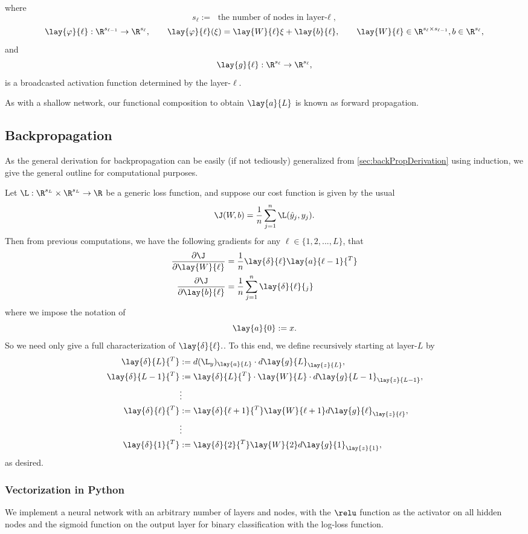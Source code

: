 where
$$s_\ell :=\text{ the number of nodes in layer-$\ell$},$$
$$\lay{\varphi}{\ell}:\R^{s_{\ell-1}}\to\R^{s_\ell},\qquad \lay{\varphi}{\ell}(\xi)=\lay{W}{\ell}\xi+\lay{b}{\ell},\qquad \lay{W}{\ell}\in\R^{s_\ell\times s_{\ell-1}},b\in\R^{s_\ell},$$
and
$$\lay{g}{\ell}:\R^{s_\ell}\to\R^{s_\ell},$$
is a broadcasted activation function determined by the layer-$\ell$.

As with a shallow network, our functional composition to obtain $\lay{a}{L}$ is known as forward propagation.

\subsection{Backpropagation}
As the general derivation for backpropagation can be easily (if not tediously) generalized from \cref{sec:backPropDerivation} using induction, we give the general outline for computational purposes.

Let $\L:\R^{s_L}\times\R^{s_L}\to\R$ be a generic loss function, and suppose our cost function is given by the usual
$$\J(W,b)=\frac{1}{n}\sum_{j=1}^n\L(\hat{y}_j,y_j).$$
Then from previous computations, we have the following gradients for any $\ell\in\{1,2,...,L\}$, that
\begin{align*}
	\frac{\partial\J}{\partial\lay{W}{\ell}}&=\frac{1}{n}\lay{\delta}{\ell}\lay{a}{\ell-1}{^T}\\
	\frac{\partial\J}{\partial\lay{b}{\ell}}&=\frac{1}{n}\sum_{j=1}^n\lay{\delta}{\ell}{_j}
\end{align*}
where we impose the notation of
$$\lay{a}{0}:=x.$$
So we need only give a full characterization of $\lay{\delta}{\ell}.$. To this end, we define recursively starting at layer-$L$ by
\begin{align*}
	\lay{\delta}{L}{^T}&:=d(\L_y)_{\lay{a}{L}}\cdot d\lay{g}{L}_{\lay{z}{L}},\\
	\lay{\delta}{L-1}{^T}&:=\lay{\delta}{L}{^T}\cdot\lay{W}{L}\cdot d\lay{g}{L-1}_{\lay{z}{L-1}},\\
	&\vdots\\
	\lay{\delta}{\ell}{^T}&:=\lay{\delta}{\ell+1}{^T}\lay{W}{\ell+1}d\lay{g}{\ell}_{\lay{z}{\ell}},\\
	&\vdots\\
	\lay{\delta}{1}{^T}&:=\lay{\delta}{2}{^T}\lay{W}{2}d\lay{g}{1}_{\lay{z}{1}},
\end{align*}
as desired.



\subsubsection{Vectorization in Python}
We implement a neural network with an arbitrary number of layers and nodes, with the $\relu$ function as the activator on all hidden nodes and the sigmoid function on the output layer for binary classification with the log-loss function.















